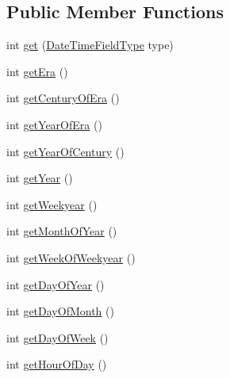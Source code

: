 \subsection*{Public Member Functions}
\begin{DoxyCompactItemize}
\item 
int \hyperlink{classorg_1_1joda_1_1time_1_1base_1_1_abstract_date_time_af30504cd429178fe15ecf1df8684cc85}{get} (\hyperlink{classorg_1_1joda_1_1time_1_1_date_time_field_type}{Date\-Time\-Field\-Type} type)
\item 
int \hyperlink{classorg_1_1joda_1_1time_1_1base_1_1_abstract_date_time_a70650a7eebafe4dcf63ab41e04420edc}{get\-Era} ()
\item 
int \hyperlink{classorg_1_1joda_1_1time_1_1base_1_1_abstract_date_time_a6787831a2cb6772dc831caba9a13191a}{get\-Century\-Of\-Era} ()
\item 
int \hyperlink{classorg_1_1joda_1_1time_1_1base_1_1_abstract_date_time_afeb43550afaa71789efe0189e439e9e4}{get\-Year\-Of\-Era} ()
\item 
int \hyperlink{classorg_1_1joda_1_1time_1_1base_1_1_abstract_date_time_a16ed51b35f7774e9ed9a27728ef1213c}{get\-Year\-Of\-Century} ()
\item 
int \hyperlink{classorg_1_1joda_1_1time_1_1base_1_1_abstract_date_time_ac66a6941fbf8f66d82b36c478e18ea52}{get\-Year} ()
\item 
int \hyperlink{classorg_1_1joda_1_1time_1_1base_1_1_abstract_date_time_a158c65fb322e1e2b857dd8bbe2d59e8f}{get\-Weekyear} ()
\item 
int \hyperlink{classorg_1_1joda_1_1time_1_1base_1_1_abstract_date_time_a2baa56599b1fadde73db4567d7ab6753}{get\-Month\-Of\-Year} ()
\item 
int \hyperlink{classorg_1_1joda_1_1time_1_1base_1_1_abstract_date_time_a41f7f9bd6203c153a003d0577aab078d}{get\-Week\-Of\-Weekyear} ()
\item 
int \hyperlink{classorg_1_1joda_1_1time_1_1base_1_1_abstract_date_time_acf877a6e1a981b48884aff7d446bafc8}{get\-Day\-Of\-Year} ()
\item 
int \hyperlink{classorg_1_1joda_1_1time_1_1base_1_1_abstract_date_time_a68d94f039c4b315142ff26a13c29d675}{get\-Day\-Of\-Month} ()
\item 
int \hyperlink{classorg_1_1joda_1_1time_1_1base_1_1_abstract_date_time_a7a67b0279bca2a855eb4dffc8f0e45e2}{get\-Day\-Of\-Week} ()
\item 
int \hyperlink{classorg_1_1joda_1_1time_1_1base_1_1_abstract_date_time_a62ed23997a651926bf71fb42c5e32457}{get\-Hour\-Of\-Day} ()

\end{DoxyCompactItemize}
